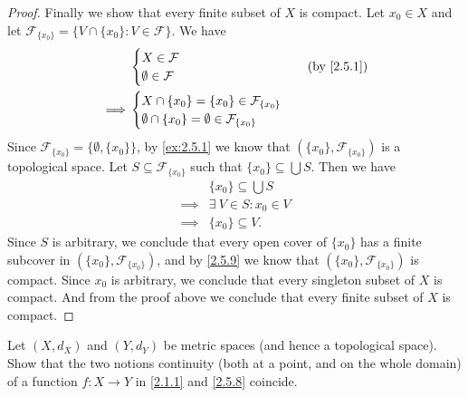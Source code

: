 \begin{proof}
  Finally we show that every finite subset of \(X\) is compact.
  Let \(x_0 \in X\) and let \(\mathcal{F}_{\{x_0\}} = \big\{V \cap \{x_0\} : V \in \mathcal{F}\big\}\).
  We have
  \begin{align*}
             & \begin{cases}
                 X \in \mathcal{F} \\
                 \emptyset \in \mathcal{F}
               \end{cases}                                    & \text{(by \cref{2.5.1})} \\
    \implies & \begin{cases}
                 X \cap \{x_0\} = \{x_0\} \in \mathcal{F}_{\{x_0\}} \\
                 \emptyset \cap \{x_0\} = \emptyset \in \mathcal{F}_{\{x_0\}}
               \end{cases}
  \end{align*}
  Since \(\mathcal{F}_{\{x_0\}} = \big\{\emptyset, \{x_0\}\big\}\), by \cref{ex:2.5.1} we know that \((\{x_0\}, \mathcal{F}_{\{x_0\}})\) is a topological space.
  Let \(S \subseteq \mathcal{F}_{\{x_0\}}\) such that \(\{x_0\} \subseteq \bigcup S\).
  Then we have
  \begin{align*}
             & \{x_0\} \subseteq \bigcup S  \\
    \implies & \exists\ V \in S : x_0 \in V \\
    \implies & \{x_0\} \subseteq V.
  \end{align*}
  Since \(S\) is arbitrary, we conclude that every open cover of \(\{x_0\}\) has a finite subcover in \((\{x_0\}, \mathcal{F}_{\{x_0\}})\), and by \cref{2.5.9} we know that \((\{x_0\}, \mathcal{F}_{\{x_0\}})\) is compact.
  Since \(x_0\) is arbitrary, we conclude that every singleton subset of \(X\) is compact.
  And from the proof above we conclude that every finite subset of \(X\) is compact.
\end{proof}

\begin{ex}\label{ex:2.5.15}
  Let \((X, d_X)\) and \((Y, d_Y)\) be metric spaces (and hence a topological space).
  Show that the two notions continuity (both at a point, and on the whole domain) of a function \(f : X \to Y\) in \cref{2.1.1} and \cref{2.5.8} coincide.
\end{ex}

